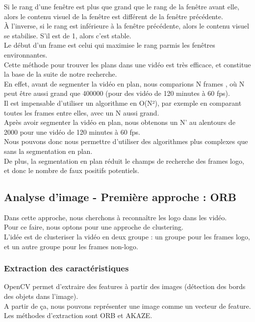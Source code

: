 \documentclass[11pt]{article}
\begin{document}
Si le rang d'une fenêtre est plus que grand que le rang de la fenêtre avant elle, alors le contenu visuel de la fenêtre est différent de la fenêtre précédente.\\
À l'inverse, si le rang est inférieure à la fenêtre précédente, alors le contenu visuel se stabilise. S'il est de 1, alors c'est stable.\\

Le début d'un frame est celui qui maximise le rang parmis les fenêtres environnantes.\\

Cette méthode pour trouver les plans dans une vidéo est très efficace, et constitue la base de la suite de notre recherche.\\

En effet, avant de segmenter la vidéo en plan, nous comparions  N frames , où N peut être aussi grand que 400000 (pour des vidéo de 120 minutes à 60 fps).\\
Il est impensable d’utiliser un algorithme en O(N²), par exemple en comparant toutes les frames entre elles, avec un N aussi grand.\\

Après avoir segmenter la vidéo en plan, nous obtenons un N’ au alentours de 2000 pour une vidéo de 120 minutes à 60 fps.\\
Nous pouvons donc nous permettre d’utiliser des algorithmes plus complexes que sans la segmentation en plan.\\
De plus, la segmentation en plan réduit le champs de recherche des frames logo, et donc le nombre de faux positifs potentiels.\\

\subsection{Analyse d'image - Première approche : ORB}
\label{sec:org0a1d7ee}
Dans cette approche, nous cherchons à reconnaître les logo dans les vidéo.\\
Pour ce faire, nous optons pour une approche de clustering.\\
L'idée est de clusteriser la vidéo en deux groupe : un groupe pour les frames logo, et un autre groupe pour les frames non-logo.\\

\subsubsection{Extraction des caractéristiques}
\label{sec:orgbc7cce0}
OpenCV permet d'extraire des features à partir des images (détection des bords des objets dans l'image).\\
A partir de ça, nous pouvons représenter une image comme un vecteur de feature.\\
Les méthodes d'extraction sont ORB \cite{Rublee_2011} et AKAZE.\\
\end{document}
